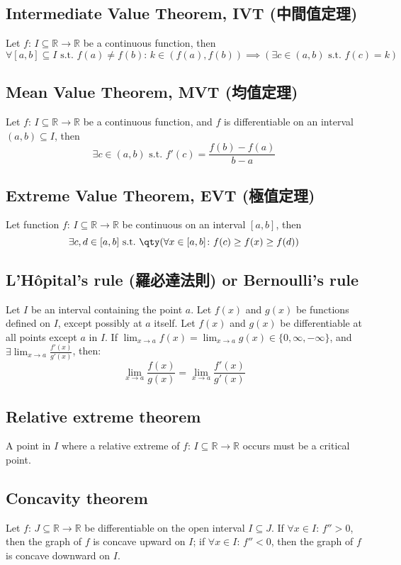 \documentclass[a4paper,12pt]{report}
\begin{document}
\subsection{Intermediate Value Theorem, IVT (中間值定理)}
Let $f:\, I\subseteq\mathbb{R}\to\mathbb{R}$ be a continuous function, then
\[\forall [a,b]\subseteq I \text{\ s.t.\ } f(a)\neq f(b):\,k\in (f(a), f(b))\implies (\exists c\in (a,b) \text{\ s.t.\ }f(c)=k)\]
\subsection{Mean Value Theorem, MVT (均值定理)}
Let $f:\, I\subseteq\mathbb{R}\to\mathbb{R}$ be a continuous function, and $f$ is differentiable on an interval $(a, b)\subseteq I$, then
\[\exists c\in (a, b)\text{\ s.t.\ }f'(c)=\frac{f(b)-f(a)}{b-a}\]
\subsection{Extreme Value Theorem, EVT (極值定理)}
Let function $f:\, I\subseteq\mathbb{R}\to\mathbb{R}$ be continuous on an interval $[a,b]$, then
\[\exists c,d \in [a, b] \text{\ s.t.\ }\qty(\forall x \in [a, b]\colon f(c)\geq f(x)\geq f(d))\]
\subsection{L'Hôpital's rule (羅必達法則) or Bernoulli's rule}
Let \(I\) be an interval containing the point \(a\). Let \( f(x) \) and \( g(x) \) be functions defined on \(I\), except possibly at \(a\) itself. Let \( f(x) \) and \( g(x) \) be differentiable at all points except $a$ in $I$. If $\lim_{x\to a}f(x)=\lim_{x\to a}g(x)\in\{0,\infty,-\infty\}$, and $\exists \lim_{x\to a}\frac{f'(x)}{g'(x)}$, then:
\[\lim_{x\to a}\frac{f(x)}{g(x)}=\lim_{x\to a}\frac{f'(x)}{g'(x)}\]
\subsection{Relative extreme theorem}
A point in $I$ where a relative extreme of $f:\,I\subseteq\mathbb{R}\to\mathbb{R}$ occurs must be a critical point.
\subsection{Concavity theorem}
Let $f:\,J\subseteq\mathbb{R}\to\mathbb{R}$ be differentiable on the open interval $I\subseteq J$. If $\forall x\in I:\,f''>0$, then the graph of $f$ is concave upward on $I$; if $\forall x\in I:\,f''<0$, then the graph of $f$ is concave downward on $I$.
\end{document}
